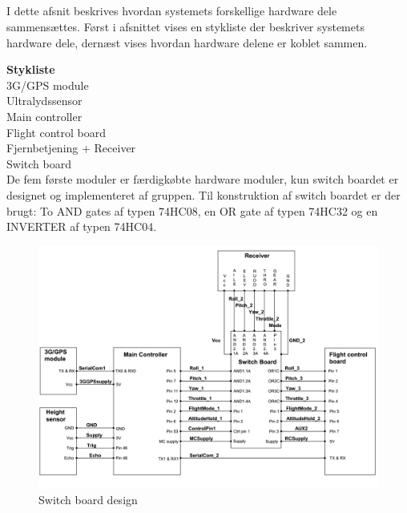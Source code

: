 \newpage

\subsection{}
I dette afsnit beskrives hvordan systemets forskellige hardware dele sammensættes.
Først i afsnittet vises en stykliste der beskriver systemets hardware dele, dernæst vises hvordan hardware delene er koblet sammen.

\textbf{Stykliste}\\
3G/GPS module\\
Ultralydssensor\\
Main controller\\
Flight control board\\
Fjernbetjening + Receiver\\
Switch board\\

De fem første moduler er færdigkøbte hardware moduler, kun switch boardet er designet og implementeret af gruppen. Til konstruktion af switch boardet er der brugt: To AND gates af typen 74HC08, en OR gate af typen 74HC32 og en INVERTER af typen 74HC04.


\begin{figure}[H]
	\centering
	\includegraphics[width=1\textwidth]{Billeder/hardware/hardware_oversigt.png}
	\caption{Switch board design}
	\label{fig:switchboard_design}
\end{figure}
